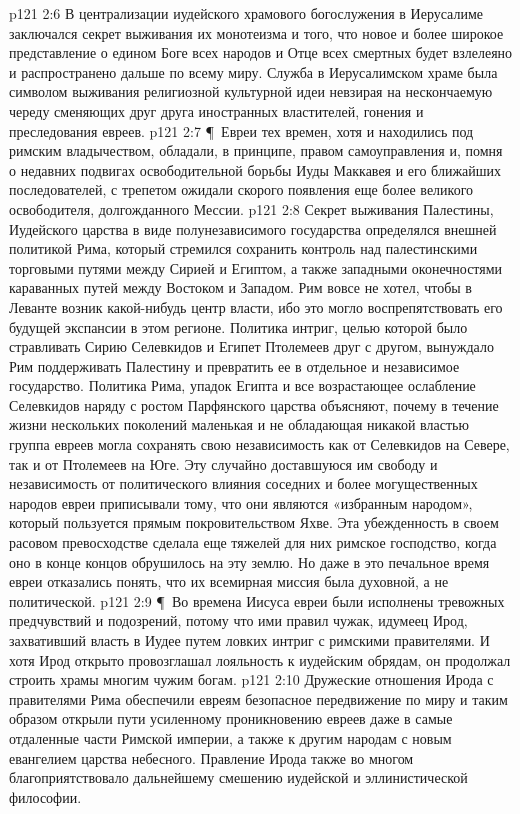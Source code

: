 \vs p121 2:6 В централизации иудейского храмового богослужения в Иерусалиме заключался секрет выживания их монотеизма и того, что новое и более широкое представление о едином Боге всех народов и Отце всех смертных будет взлелеяно и распространено дальше по всему миру. Служба в Иерусалимском храме была символом выживания религиозной культурной идеи невзирая на нескончаемую череду сменяющих друг друга иностранных властителей, гонения и преследования евреев.
\vs p121 2:7 \P\ Евреи тех времен, хотя и находились под римским владычеством, обладали, в принципе, правом самоуправления и, помня о недавних подвигах освободительной борьбы Иуды Маккавея и его ближайших последователей, с трепетом ожидали скорого появления еще более великого освободителя, долгожданного Мессии.
\vs p121 2:8 Секрет выживания Палестины, Иудейского царства в виде полунезависимого государства определялся внешней политикой Рима, который стремился сохранить контроль над палестинскими торговыми путями между Сирией и Египтом, а также западными оконечностями караванных путей между Востоком и Западом. Рим вовсе не хотел, чтобы в Леванте возник какой\hyp{}нибудь центр власти, ибо это могло воспрепятствовать его будущей экспансии в этом регионе. Политика интриг, целью которой было стравливать Сирию Селевкидов и Египет Птолемеев друг с другом, вынуждало Рим поддерживать Палестину и превратить ее в отдельное и независимое государство. Политика Рима, упадок Египта и все возрастающее ослабление Селевкидов наряду с ростом Парфянского царства объясняют, почему в течение жизни нескольких поколений маленькая и не обладающая никакой властью группа евреев могла сохранять свою независимость как от Селевкидов на Севере, так и от Птолемеев на Юге. Эту случайно доставшуюся им свободу и независимость от политического влияния соседних и более могущественных народов евреи приписывали тому, что они являются «избранным народом», который пользуется прямым покровительством Яхве. Эта убежденность в своем расовом превосходстве сделала еще тяжелей для них римское господство, когда оно в конце концов обрушилось на эту землю. Но даже в это печальное время евреи отказались понять, что их всемирная миссия была духовной, а не политической.
\vs p121 2:9 \P\ Во времена Иисуса евреи были исполнены тревожных предчувствий и подозрений, потому что ими правил чужак, идумеец Ирод, захвативший власть в Иудее путем ловких интриг с римскими правителями. И хотя Ирод открыто провозглашал лояльность к иудейским обрядам, он продолжал строить храмы многим чужим богам.
\vs p121 2:10 Дружеские отношения Ирода с правителями Рима обеспечили евреям безопасное передвижение по миру и таким образом открыли пути усиленному проникновению евреев даже в самые отдаленные части Римской империи, а также к другим народам с новым евангелием царства небесного. Правление Ирода также во многом благоприятствовало дальнейшему смешению иудейской и эллинистической философии.
